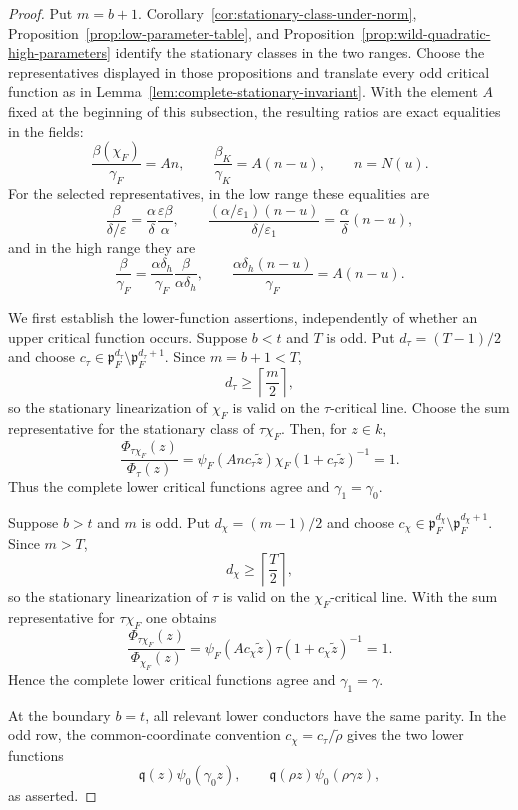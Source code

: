 \documentclass[11pt]{amsart}
\theoremstyle{definition}
\theoremstyle{remark}
\newcommand{\p}{\mathfrak p}
\begin{document}
\begin{proof}
Put $m=b+1$.  Corollary~\ref{cor:stationary-class-under-norm},
Proposition~\ref{prop:low-parameter-table}, and
Proposition~\ref{prop:wild-quadratic-high-parameters} identify the
stationary classes in the two ranges.  Choose the representatives
displayed in those propositions and translate every odd critical
function as in Lemma~\ref{lem:complete-stationary-invariant}.  With the
element $A$ fixed at the beginning of this subsection, the resulting
ratios are exact equalities in the fields:
\begin{equation}\label{eq:quadratic-unified-stationary-ratios}
 \frac{\beta(\chi_F)}{\gamma_F}=An,
 \qquad
 \frac{\beta_K}{\gamma_K}=A(n-u),
 \qquad n=N(u).
\end{equation}
For the selected representatives, in the low range these equalities are
\[
 \frac{\beta}{\delta/\varepsilon}
   =\frac{\alpha}{\delta}\frac{\varepsilon\beta}{\alpha},
 \qquad
 \frac{(\alpha/\varepsilon_1)(n-u)}{\delta/\varepsilon_1}
   =\frac{\alpha}{\delta}(n-u),
\]
and in the high range they are
\[
 \frac{\beta}{\gamma_F}
   =\frac{\alpha\delta_h}{\gamma_F}
      \frac{\beta}{\alpha\delta_h},
 \qquad
 \frac{\alpha\delta_h(n-u)}{\gamma_F}=A(n-u).
\]

We first establish the lower-function assertions, independently of
whether an upper critical function occurs.  Suppose $b<t$ and $T$ is
odd.  Put $d_\tau=(T-1)/2$ and choose
$c_\tau\in\p_F^{d_\tau}\setminus\p_F^{d_\tau+1}$.  Since
$m=b+1<T$,
\[
 d_\tau\ge\left\lceil\frac m2\right\rceil,
\]
so the stationary linearization of $\chi_F$ is valid on the
$\tau$-critical line.  Choose the sum representative for the
stationary class of $\tau\chi_F$.  Then, for $z\in k$,
\[
 \frac{\Phi_{\tau\chi_F}(z)}{\Phi_\tau(z)}
 =\psi_F(An c_\tau\widetilde z)
   \chi_F(1+c_\tau\widetilde z)^{-1}=1.
\]
Thus the complete lower critical functions agree and
$\gamma_1=\gamma_0$.

Suppose $b>t$ and $m$ is odd.  Put $d_\chi=(m-1)/2$ and choose
$c_\chi\in\p_F^{d_\chi}\setminus\p_F^{d_\chi+1}$.  Since $m>T$,
\[
 d_\chi\ge\left\lceil\frac T2\right\rceil,
\]
so the stationary linearization of $\tau$ is valid on the
$\chi_F$-critical line.  With the sum representative for
$\tau\chi_F$ one obtains
\[
 \frac{\Phi_{\tau\chi_F}(z)}{\Phi_{\chi_F}(z)}
 =\psi_F(Ac_\chi\widetilde z)
   \tau(1+c_\chi\widetilde z)^{-1}=1.
\]
Hence the complete lower critical functions agree and
$\gamma_1=\gamma$.

At the boundary $b=t$, all relevant lower conductors have the same
parity.  In the odd row, the common-coordinate convention
$c_\chi=c_\tau/\widetilde\rho$ gives the two lower functions
\[
 \mathfrak q(z)\psi_0(\gamma_0z),
 \qquad
 \mathfrak q(\rho z)\psi_0(\rho\gamma z),
\]
as asserted.


\end{proof}
\end{document}
